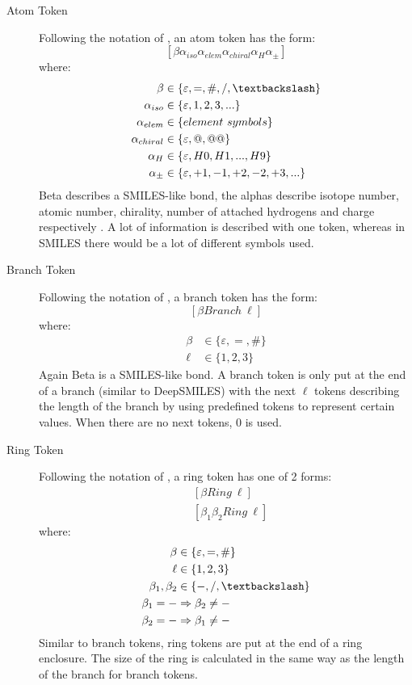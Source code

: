 \begin{description}
    \item[Atom Token] Following the notation of \textcite{lo2023recent}, an atom token has the form:
    \[[\beta\alpha_{iso}\alpha_{elem}\alpha_{chiral}\alpha_{H}\alpha_{\pm}]\]
    where:
    \begin{align*} 
    \beta &\in  \{\varepsilon, = , \#,/, \textbackslash\} \\ 
    \alpha_{iso} &\in  \{\varepsilon,1,2,3,...\} \\
    \alpha_{elem} &\in  \{element\ symbols\} \\ 
    \alpha_{chiral} &\in  \{\varepsilon, @, @@\} \\
    \alpha_{H} &\in  \{\varepsilon,H0,H1,...,H9\} \\
    \alpha_{\pm} &\in  \{\varepsilon,+1,-1,+2,-2,+3,...\}
    \end{align*}
    Beta describes a SMILES-like bond, the alphas describe isotope number, atomic number, chirality, number of attached hydrogens and charge respectively \cite{lo2023recent}. A lot of information is described with one token, whereas in SMILES there would be a lot of different symbols used.
    
    \item[Branch Token] Following the notation of \textcite{lo2023recent}, a branch token has the form:
    \[[\beta Branch\ \ell]\]
    where:
    \begin{align*} 
    \beta &\in  \{\varepsilon, = , \#\} \\ 
    \ell &\in \{1, 2, 3\}
    \end{align*}
    Again Beta is a SMILES-like bond. A branch token is only put at the end of a branch (similar to DeepSMILES) with the next $\ell$ tokens describing the length of the branch by using predefined tokens to represent certain values. When there are no next tokens, 0 is used.

    \item[Ring Token] Following the notation of \textcite{lo2023recent}, a ring token has one of 2 forms:
    \begin{align*} 
    &[\beta Ring\ \ell] \\ 
    &[\beta_1\beta_2 Ring\ \ell]
    \end{align*} where: \begin{align*} 
    \beta &\in  \{\varepsilon, = , \#\} \\
    \ell &\in \{1, 2, 3\} \\
    \beta_1,\beta_2 &\in \{-, /, \textbackslash\} \\
    \beta_1 = -& \Rightarrow \beta_2 \neq - \\
    \beta_2 = -& \Rightarrow \beta_1 \neq -
    \end{align*}
    Similar to branch tokens, ring tokens are put at the end of a ring enclosure. The size of the ring is calculated in the same way as the length of the branch for branch tokens.


\end{description}
